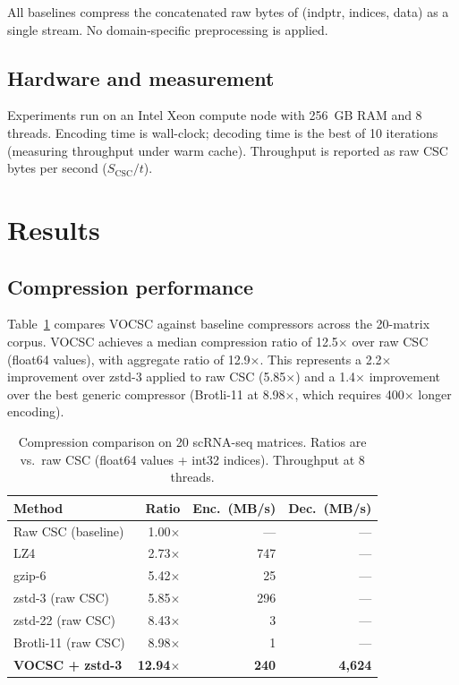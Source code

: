 \documentclass[10pt,twocolumn,letterpaper]{article}
\begin{document}
All baselines compress the concatenated raw bytes of (indptr, indices, data) as a single stream.
No domain-specific preprocessing is applied.

\subsection{Hardware and measurement}

Experiments run on an Intel Xeon compute node with 256~GB RAM and 8 threads.
Encoding time is wall-clock; decoding time is the best of 10 iterations (measuring throughput under warm cache).
Throughput is reported as raw CSC bytes per second ($S_{\text{CSC}} / t$).

\section{Results}

\subsection{Compression performance}

Table~\ref{tab:main} compares VOCSC against baseline compressors across the 20-matrix corpus.
VOCSC achieves a median compression ratio of 12.5$\times$ over raw CSC (float64 values), with aggregate ratio of 12.9$\times$.
This represents a 2.2$\times$ improvement over zstd-3 applied to raw CSC (5.85$\times$) and a 1.4$\times$ improvement over the best generic compressor (Brotli-11 at 8.98$\times$, which requires 400$\times$ longer encoding).

\begin{table}[t]
\centering
\caption{Compression comparison on 20 scRNA-seq matrices. Ratios are vs.\ raw CSC (float64 values + int32 indices). Throughput at 8 threads.}
\label{tab:main}
\footnotesize
\begin{tabular}{lrrr}
\toprule
Method & Ratio & Enc.\ (MB/s) & Dec.\ (MB/s) \\
\midrule
Raw CSC (baseline)  &  1.00$\times$ & --- & --- \\
LZ4                 &  2.73$\times$ &  747 & --- \\
gzip-6              &  5.42$\times$ &   25 & --- \\
zstd-3 (raw CSC)    &  5.85$\times$ &  296 & --- \\
zstd-22 (raw CSC)   &  8.43$\times$ &    3 & --- \\
Brotli-11 (raw CSC) &  8.98$\times$ &    1 & --- \\
\midrule
\textbf{VOCSC + zstd-3} & \textbf{12.94}$\times$ & \textbf{240} & \textbf{4,624} \\
\bottomrule
\end{tabular}
\end{table}
\end{document}
